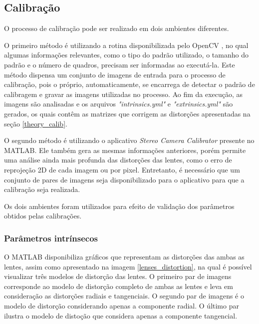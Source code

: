\subsection{Calibração}
O processo de calibração pode ser realizado em dois ambientes diferentes.  

O primeiro método é utilizando a rotina disponibilizada pelo OpenCV \cite{OpenCVCalibrationTutorial}, no qual algumas informações relevantes, como o tipo do padrão utilizado, o tamanho do padrão e o número de quadros, precisam ser informadas ao executá-la. Este método dispensa um conjunto de imagens de entrada para o processo de calibração, pois o próprio, automaticamente, se encarrega de detectar o padrão de calibragem e gravar as imagens utilizadas no processo. Ao fim da execução, as imagens são analisadas e os arquivos \textit{"intrinsics.yml"} e \textit{"extrinsics.yml"} são gerados, os quais contêm as matrizes que corrigem as distorções apresentadas na seção \ref{theory_calib}.

O segundo método é utilizando o aplicativo \textit{Stereo Camera Calibrator} presente no MATLAB. Ele também gera as mesmas informações anteriores, porém permite uma análise ainda mais profunda das distorções das lentes, como o erro de reprojeção 2D de cada imagem ou por pixel. Entretanto, é necessário que um conjunto de pares de imagens seja disponibilizado para o aplicativo para que a calibração seja realizada.

Os dois ambientes foram utilizados para efeito de validação dos parâmetros obtidos pelas calibrações.

\subsubsection{Parâmetros intrínsecos}

O MATLAB disponibiliza gráficos que representam as distorções das ambas as lentes, assim como apresentado na imagem \ref{lenses_distortion}, na qual é possível visualizar três modelos de distorção das lentes. O primeiro par de imagens corresponde ao modelo de distorção completo de ambas as lentes e leva em consideração as distorções radiais e tangenciais. O segundo par de imagens é o modelo de distorção considerando apenas a componente radial. O último par ilustra o modelo de distoção que considera apenas a componente tangencial.

